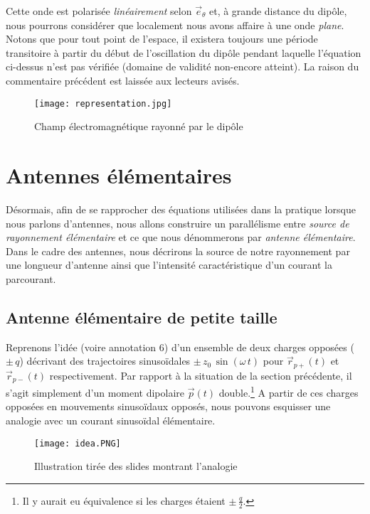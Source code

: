 Cette onde est polarisée \textit{linéairement} selon $\vec{e}_{\theta}$ et, à grande distance du dipôle, nous pourrons considérer que localement nous avons affaire à une onde \textit{plane}.\\
Notons que pour tout point de l'espace, il existera toujours une période transitoire à partir du début de l'oscillation du dipôle pendant laquelle l'équation ci-dessus n'est pas vérifiée (domaine de validité non-encore atteint). La raison du commentaire précédent est laissée aux lecteurs avisés. 

\begin{figure}[h]\centering
\texttt{[image: representation.jpg]}
\caption{Champ électromagnétique rayonné par le dipôle}
\label{fig:dipo2}
\end{figure}


\section{Antennes élémentaires}

Désormais, afin de se rapprocher des équations utilisées dans la pratique lorsque nous parlons d'antennes, nous allons construire un parallélisme entre \textit{source de rayonnement élémentaire} et ce que nous dénommerons par \textit{antenne élémentaire}. Dans le cadre des antennes, nous décrirons la source de notre rayonnement par une longueur d'antenne ainsi que l'intensité caractéristique d'un courant la parcourant.
\subsection{Antenne élémentaire de petite taille}
Reprenons l'idée (voire annotation $6$) d'un ensemble de deux charges opposées ($\pm\,q$) décrivant des trajectoires sinusoïdales $\pm\,z_0\,\sin(\omega\,t)$ pour $\vec{r}_{p+}(t)$ et $\vec{r}_{p-}(t)$ respectivement. Par rapport à la situation de la section précédente, il s'agit simplement d'un moment dipolaire $\vec{p}(t)$ double.\footnote{Il y aurait eu équivalence si les charges étaient $\pm\,\frac{q}{2}$.} A partir de ces charges opposées en mouvements sinusoïdaux opposés, nous pouvons esquisser une analogie avec un courant sinusoïdal élémentaire. 

\begin{figure}[h]\centering
\texttt{[image: idea.PNG]}
\caption{Illustration tirée des slides montrant l'analogie}
\label{fig:ae}
\end{figure}

